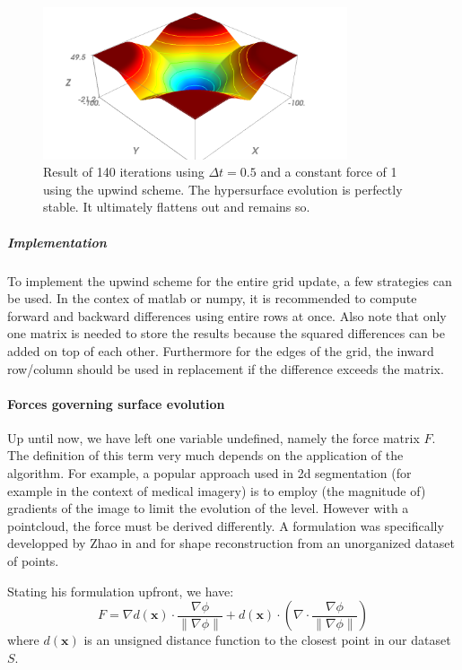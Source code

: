 \documentclass{article}
\begin{document}
\begin{figure}[H]
  \centering
  \includegraphics[width=0.8\textwidth]{img/up02.png}
  \caption{Result of 140 iterations using $ \Delta t = 0.5$ and a constant force
  of 1 using the upwind scheme. The hypersurface evolution is perfectly stable.
  It ultimately flattens out and remains so.}    
\end{figure}

\subparagraph{Implementation}
To implement the upwind scheme for the entire grid
update, a few strategies can be used. In the contex of matlab or numpy, it is
recommended to compute forward and backward differences using entire rows at
once. Also note that only one matrix is needed to store the results because the
squared differences can be added on top of each other.  Furthermore for the
edges of the grid, the inward row/column should be used in replacement if the
difference exceeds the matrix.

\paragraph{Forces governing surface evolution}
Up until now, we have left one variable undefined, namely the force matrix $F$.
The definition of this term very much depends on the application of the
algorithm. For example, a popular approach used in 2d segmentation (for example
in the context of medical imagery) is to employ (the magnitude of) gradients of
the image to limit the evolution of the level. However with a pointcloud, the
force must be derived differently. A formulation was specifically developped by
Zhao in \cite{zhao1} and \cite{zhao2001fast} for shape reconstruction from an
unorganized dataset of points.

Stating his formulation upfront, we have:
\[
F = \nabla d(\mathbf{x}) \cdot \frac{\nabla \phi}{\| \nabla \phi \|}
+ d(\mathbf{x}) \cdot (\nabla \cdot \frac{\nabla \phi}{\| \nabla \phi \|} )
\]
where $d(\mathbf{x})$ is an unsigned distance function to the closest point in
our dataset $S$.
\end{document}
